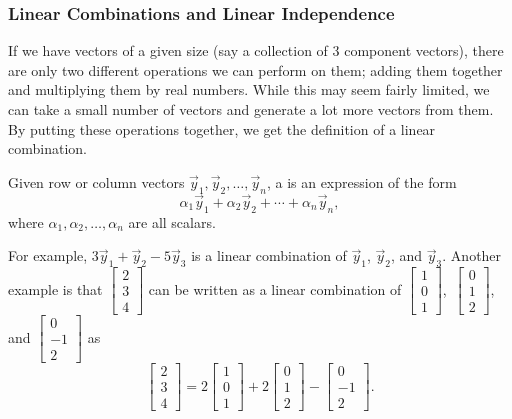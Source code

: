\documentclass{ximera}
\begin{document}
\subsubsection{Linear Combinations and Linear Independence}

If we have vectors of a given size (say a collection of 3 component vectors), there are only two different operations we can perform on them; adding them together and multiplying them by real numbers. While this may seem fairly limited, we can take a small number of vectors and generate a lot more vectors from them. By putting these operations together, we get the definition of a linear combination. 

\begin{definition}
    Given row or column vectors $\vec{y}_1, \vec{y}_2, \ldots, \vec{y}_n$, a \emph{} is an expression of the form
    \begin{equation*}
        \alpha_1 \vec{y}_1 +  \alpha_2 \vec{y}_2 + \cdots + \alpha_n \vec{y}_n ,
    \end{equation*}
    where $\alpha_1, \alpha_2, \ldots, \alpha_n$ are all scalars.
\end{definition}%
For example, $3 \vec{y}_1 + \vec{y}_2 - 5 \vec{y}_3$ is a linear combination of $\vec{y}_1$, $\vec{y}_2$, and $\vec{y}_3$. Another example is that $\left[\begin{smallmatrix} 2 \\ 3 \\ 4 \end{smallmatrix} \right]$ can be written as a linear combination of $\left[\begin{smallmatrix} 1 \\ 0 \\ 1 \end{smallmatrix}\right]$,\ $\left[\begin{smallmatrix} 0 \\ 1 \\ 2 \end{smallmatrix}\right]$, and $\left[\begin{smallmatrix}  0 \\ -1 \\ 2 \end{smallmatrix}\right]$ as 
\begin{equation*}
    \begin{bmatrix} 2 \\ 3 \\ 4 \end{bmatrix} = 2\begin{bmatrix}  1 \\ 0 \\ 1 \end{bmatrix} + 2 \begin{bmatrix} 0 \\ 1 \\ 2  \end{bmatrix} - \begin{bmatrix} 0 \\ -1 \\ 2 \end{bmatrix}.
\end{equation*}
\end{document}
